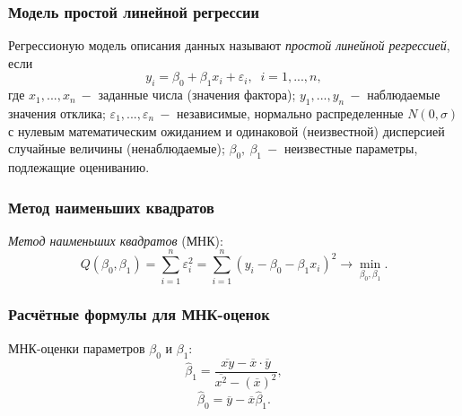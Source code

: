 \documentclass[a4paper]{article}
\begin{document}
\subsubsection{Модель простой линейной регрессии}
Регрессионую модель описания данных называют \textit{простой линейной регрессией}, если
\begin{equation}
    y_i=\beta_0 + \beta_1 x_i + \varepsilon_i,\;\;i=1,...,n,
\end{equation}
где $x_1, ..., x_n\:-$ заданные числа (значения фактора); $y_1,...,y_n\:-$ наблюдаемые значения отклика; $\varepsilon_1,...,\varepsilon_n\:-$ независимые, нормально распределенные $N(0,\sigma)$ с нулевым математическим ожиданием и одинаковой (неизвестной) дисперсией случайные величины (ненаблюдаемые); $\beta_0,\:\beta_1\:-$ неизвестные параметры, подлежащие оцениванию.
\subsubsection{Метод наименьших квадратов}
\textit{Метод наименьших квадратов} (МНК):
\begin{equation}
    Q\left(\beta_0,\beta_1\right)=\sum_{i=1}^n \varepsilon_i^2= \sum_{i=1}^n\left(y_i-\beta_0-\beta_1 x_i\right)^2\to\min_{\beta_0,\beta_1}.
\end{equation}
\subsubsection{Расчётные формулы для МНК-оценок}
МНК-оценки параметров $\beta_0$ и $\beta_1$:
\begin{equation}
    \widehat{\beta}_1=\frac{\overline{xy}-\overline{x}\cdot\overline{y}}{\overline{x^2}-(\overline{x})^2},
\end{equation}
\begin{equation}
    \widehat{\beta}_0=\overline{y}-\overline{x}\widehat{\beta}_1.
\end{equation}
\end{document}
